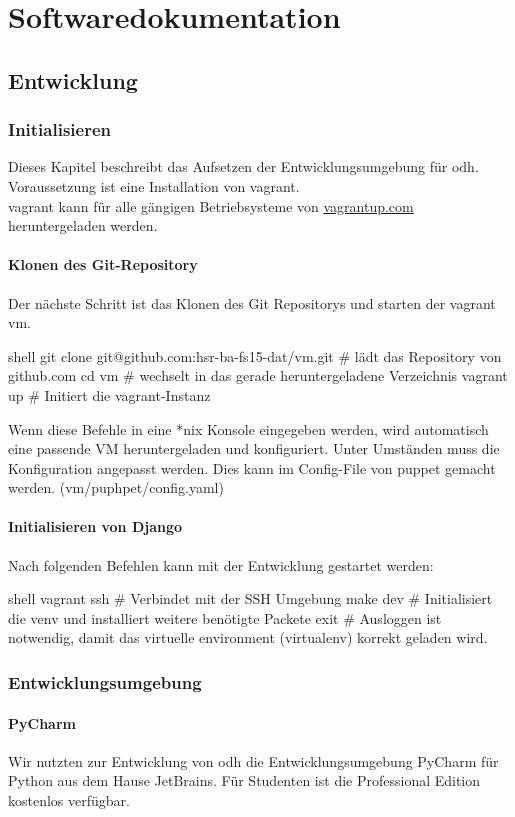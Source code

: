 \part{Softwaredokumentation}
\chapter{Entwicklung}

\section{Initialisieren}
Dieses Kapitel beschreibt das Aufsetzen der Entwicklungsumgebung für \gls{odh}. Voraussetzung ist eine Installation von \acs{vagrant}.
\\
\acs{vagrant} kann für alle gängigen Betriebsysteme von \url{vagrantup.com} heruntergeladen werden.


\subsection{Klonen des Git-Repository}
Der nächste Schritt ist das Klonen des Git Repositorys und starten der vagrant vm.
\begin{src}{shell}
git clone git@github.com:hsr-ba-fs15-dat/vm.git  # lädt das Repository von github.com
cd vm  # wechselt in das gerade heruntergeladene Verzeichnis
vagrant up  # Initiert die \ac{vagrant}-Instanz
\end{src}
Wenn diese Befehle in eine *nix Konsole eingegeben werden, wird automatisch eine passende VM heruntergeladen und konfiguriert. Unter Umständen muss die Konfiguration angepasst werden. Dies kann im Config-File von puppet gemacht werden. (vm/puphpet/config.yaml)


\subsection{Initialisieren von Django}
Nach folgenden Befehlen kann mit der Entwicklung gestartet werden:
\begin{src}{shell}
vagrant ssh # Verbindet mit der SSH Umgebung
make dev # Initialisiert die venv und installiert weitere benötigte Packete
exit # Ausloggen ist notwendig, damit das virtuelle environment (virtualenv) korrekt geladen wird.
\end{src}
\section{Entwicklungsumgebung}
\subsection{PyCharm}
Wir nutzten zur Entwicklung von \acf{odh} die Entwicklungsumgebung PyCharm für Python aus dem Hause JetBrains. Für Studenten ist die Professional Edition kostenlos verfügbar.

